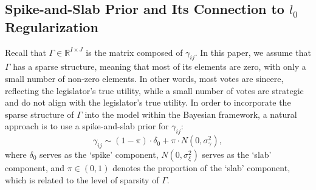 \documentclass[11pt]{article}
\begin{document}
\subsection{Spike-and-Slab Prior and Its Connection to $l_0$ Regularization}\label{sub_sec_4.1}
Recall that $ \Gamma \in \mathbb{R}^{I \times J} $ is the matrix composed of $ \gamma_{ij} $. In this paper, we assume that $ \Gamma $ has a sparse structure, meaning that most of its elements are zero, with only a small number of non-zero elements. In other words, most votes are sincere, reflecting the legislator's true utility, while a small number of votes are strategic and do not align with the legislator's true utility.
In order to incorporate the sparse structure of $ \Gamma $ into the model within the Bayesian framework, a natural approach is to use a spike-and-slab prior for $ \gamma_{ij} $:
\begin{equation*}
    \gamma_{ij} \sim (1-\pi) \cdot \delta_0 + \pi \cdot N(0, \sigma_\gamma^2),
\end{equation*}
where $ \delta_0 $ serves as the `spike' component, $ N(0, \sigma_\xi^2) $ serves as the `slab' component, and $ \pi \in (0,1) $ denotes the proportion of the `slab' component, which is related to the level of sparsity of $\Gamma$.
\end{document}
